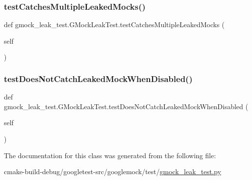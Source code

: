 \mbox{\label{classgmock__leak__test_1_1GMockLeakTest_a09465b2bfde98834e4bb9563c035f034}} 
\subsubsection{\texorpdfstring{testCatchesMultipleLeakedMocks()}{testCatchesMultipleLeakedMocks()}}
{\footnotesize\ttfamily def gmock\+\_\+leak\+\_\+test.\+G\+Mock\+Leak\+Test.\+test\+Catches\+Multiple\+Leaked\+Mocks (\begin{DoxyParamCaption}\item[{}]{self }\end{DoxyParamCaption})}

\mbox{\label{classgmock__leak__test_1_1GMockLeakTest_a3107bf5a603558ab2d97d88fb5589951}} 
\subsubsection{\texorpdfstring{testDoesNotCatchLeakedMockWhenDisabled()}{testDoesNotCatchLeakedMockWhenDisabled()}}
{\footnotesize\ttfamily def gmock\+\_\+leak\+\_\+test.\+G\+Mock\+Leak\+Test.\+test\+Does\+Not\+Catch\+Leaked\+Mock\+When\+Disabled (\begin{DoxyParamCaption}\item[{}]{self }\end{DoxyParamCaption})}



The documentation for this class was generated from the following file\+:\begin{DoxyCompactItemize}
\item 
cmake-\/build-\/debug/googletest-\/src/googlemock/test/\mbox{\hyperlink{gmock__leak__test_8py}{gmock\+\_\+leak\+\_\+test.\+py}}\end{DoxyCompactItemize}
